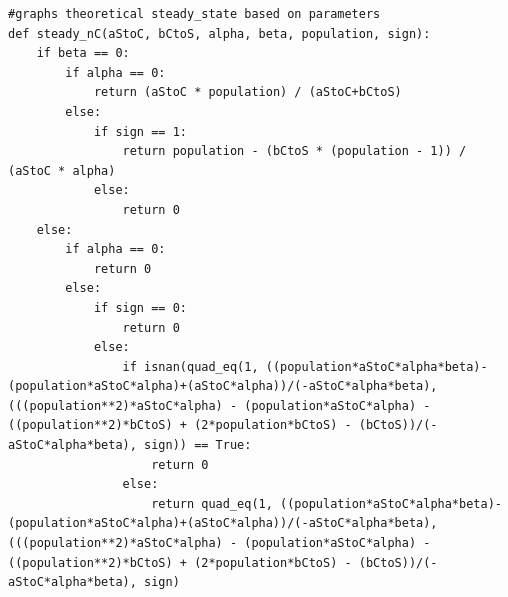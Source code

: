 \begin{lstlisting}
#graphs theoretical steady_state based on parameters    
def steady_nC(aStoC, bCtoS, alpha, beta, population, sign):
    if beta == 0:
        if alpha == 0:
            return (aStoC * population) / (aStoC+bCtoS)
        else:
            if sign == 1:
                return population - (bCtoS * (population - 1)) / (aStoC * alpha)
            else:
                return 0
    else:
        if alpha == 0:
            return 0
        else:
            if sign == 0:
                return 0
            else:
                if isnan(quad_eq(1, ((population*aStoC*alpha*beta)-(population*aStoC*alpha)+(aStoC*alpha))/(-aStoC*alpha*beta), (((population**2)*aStoC*alpha) - (population*aStoC*alpha) - ((population**2)*bCtoS) + (2*population*bCtoS) - (bCtoS))/(-aStoC*alpha*beta), sign)) == True:
                    return 0
                else:
                    return quad_eq(1, ((population*aStoC*alpha*beta)-(population*aStoC*alpha)+(aStoC*alpha))/(-aStoC*alpha*beta), (((population**2)*aStoC*alpha) - (population*aStoC*alpha) - ((population**2)*bCtoS) + (2*population*bCtoS) - (bCtoS))/(-aStoC*alpha*beta), sign)

\end{lstlisting}
\dimendef{}
